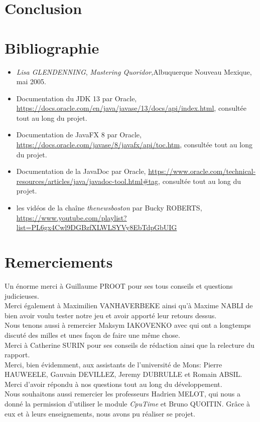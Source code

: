 \documentclass[a4paper, 12pt]{article}
\begin{document}
\section{Conclusion}



\section{Bibliographie}
\begin{itemize}
\item \emph{Lisa GLENDENNING}, \textit{Mastering Quoridor},Albuquerque Nouveau Mexique, mai 2005.
\item Documentation du JDK 13 par Oracle, \url{https://docs.oracle.com/en/java/javase/13/docs/api/index.html}, consultée tout au long du projet.
\item Documentation de JavaFX 8 par Oracle, \url{https://docs.oracle.com/javase/8/javafx/api/toc.htm}, consultée tout au long du projet.
\item Documentation de la JavaDoc par Oracle, \url{https://www.oracle.com/technical-resources/articles/java/javadoc-tool.html#tag}, consultée tout au long du projet.
\item les vidéos de la chaîne \textit{thenewsboston} par Bucky ROBERTS, \url{https://www.youtube.com/playlist?list=PL6gx4Cwl9DGBzfXLWLSYVy8EbTdpGbUIG}
\end{itemize}

\section{Remerciements}

Un énorme merci à Guillaume PROOT pour ses tous conseils et questions judicieuses. \\
Merci également à Maximilien VANHAVERBEKE ainsi qu'à Maxime NABLI de bien avoir voulu tester notre jeu et avoir apporté leur retours dessus. \\
Nous tenons aussi à remercier Maksym IAKOVENKO avec qui ont a longtemps discuté des milles et unes façon de faire une même chose. \\
Merci à Catherine SURIN pour ses conseils de rédaction ainsi que la relecture du rapport. \\
Merci, bien évidemment, aux assistants de l'université de Mons: Pierre HAUWEELE, Gauvain DEVILLEZ, Jeremy DUBRULLE et Romain ABSIL. Merci d'avoir répondu à nos questions tout au long du développement. \\
Nous souhaitons aussi remercier les professeurs Hadrien MELOT, qui nous a donné la permission d'utiliser le module \textit{CpuTime} et Bruno QUOITIN. Grâce à eux et à leurs enseignements, nous avons pu réaliser se projet.
\end{document}
